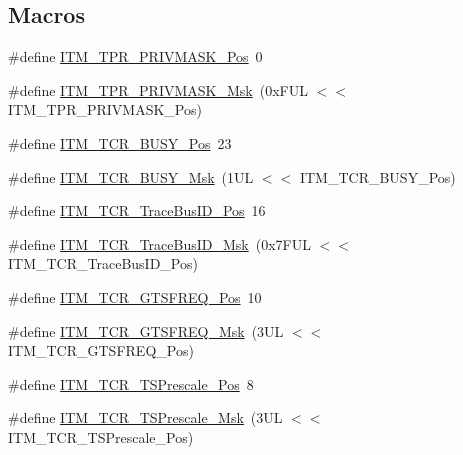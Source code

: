 \subsection*{Macros}
\begin{DoxyCompactItemize}
\item 
\#define \mbox{\hyperlink{group___c_m_s_i_s___i_t_m_ga7abe5e590d1611599df87a1884a352e8}{I\+T\+M\+\_\+\+T\+P\+R\+\_\+\+P\+R\+I\+V\+M\+A\+S\+K\+\_\+\+Pos}}~0
\item 
\#define \mbox{\hyperlink{group___c_m_s_i_s___i_t_m_ga168e089d882df325a387aab3a802a46b}{I\+T\+M\+\_\+\+T\+P\+R\+\_\+\+P\+R\+I\+V\+M\+A\+S\+K\+\_\+\+Msk}}~(0x\+F\+U\+L $<$$<$ I\+T\+M\+\_\+\+T\+P\+R\+\_\+\+P\+R\+I\+V\+M\+A\+S\+K\+\_\+\+Pos)
\item 
\#define \mbox{\hyperlink{group___c_m_s_i_s___i_t_m_ga9174ad4a36052c377cef4e6aba2ed484}{I\+T\+M\+\_\+\+T\+C\+R\+\_\+\+B\+U\+S\+Y\+\_\+\+Pos}}~23
\item 
\#define \mbox{\hyperlink{group___c_m_s_i_s___i_t_m_ga43ad7cf33de12f2ef3a412d4f354c60f}{I\+T\+M\+\_\+\+T\+C\+R\+\_\+\+B\+U\+S\+Y\+\_\+\+Msk}}~(1\+U\+L $<$$<$ I\+T\+M\+\_\+\+T\+C\+R\+\_\+\+B\+U\+S\+Y\+\_\+\+Pos)
\item 
\#define \mbox{\hyperlink{group___c_m_s_i_s___i_t_m_gaca0281de867f33114aac0636f7ce65d3}{I\+T\+M\+\_\+\+T\+C\+R\+\_\+\+Trace\+Bus\+I\+D\+\_\+\+Pos}}~16
\item 
\#define \mbox{\hyperlink{group___c_m_s_i_s___i_t_m_ga60c20bd9649d1da5a2be8e656ba19a60}{I\+T\+M\+\_\+\+T\+C\+R\+\_\+\+Trace\+Bus\+I\+D\+\_\+\+Msk}}~(0x7\+F\+U\+L $<$$<$ I\+T\+M\+\_\+\+T\+C\+R\+\_\+\+Trace\+Bus\+I\+D\+\_\+\+Pos)
\item 
\#define \mbox{\hyperlink{group___c_m_s_i_s___i_t_m_ga96c7c7cbc0d98426c408090b41f583f1}{I\+T\+M\+\_\+\+T\+C\+R\+\_\+\+G\+T\+S\+F\+R\+E\+Q\+\_\+\+Pos}}~10
\item 
\#define \mbox{\hyperlink{group___c_m_s_i_s___i_t_m_gade862cf009827f7f6748fc44c541b067}{I\+T\+M\+\_\+\+T\+C\+R\+\_\+\+G\+T\+S\+F\+R\+E\+Q\+\_\+\+Msk}}~(3\+U\+L $<$$<$ I\+T\+M\+\_\+\+T\+C\+R\+\_\+\+G\+T\+S\+F\+R\+E\+Q\+\_\+\+Pos)
\item 
\#define \mbox{\hyperlink{group___c_m_s_i_s___i_t_m_gad7bc9ee1732032c6e0de035f0978e473}{I\+T\+M\+\_\+\+T\+C\+R\+\_\+\+T\+S\+Prescale\+\_\+\+Pos}}~8
\item 
\#define \mbox{\hyperlink{group___c_m_s_i_s___i_t_m_ga7a723f71bfb0204c264d8dbe8cc7ae52}{I\+T\+M\+\_\+\+T\+C\+R\+\_\+\+T\+S\+Prescale\+\_\+\+Msk}}~(3\+U\+L $<$$<$ I\+T\+M\+\_\+\+T\+C\+R\+\_\+\+T\+S\+Prescale\+\_\+\+Pos)
\item 
$$
\end{DoxyCompactItemize}

